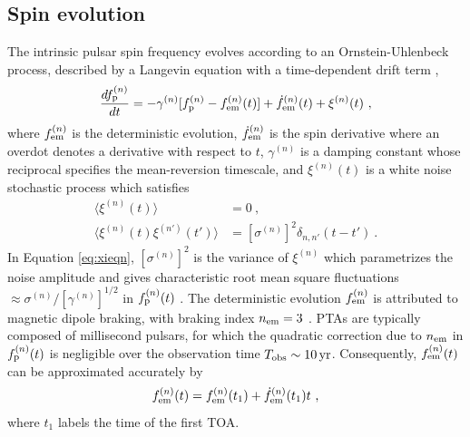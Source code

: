 \documentclass[fleqn,usenatbib,useAMS]{mnras}
\begin{document}
\subsection{Spin evolution} \label{sec:psr_frequency}
The intrinsic pulsar spin frequency evolves according to an Ornstein-Uhlenbeck process, described by a Langevin equation with a time-dependent drift term \citep{Vargas},
\begin{equation}
	\frac{df_{\rm p}^{(n)}}{dt} = -\gamma^{(n)}	 [f_{\rm p}^{(n)} - f_{\rm em}^{(n)} (t)] + \dot{f}_{\rm em}^{(n)}(t) +\xi^{(n)}(t) \ , 
	\label{eq:frequency_evolution}
\end{equation}
where $f_{\rm em}^{(n)}$ is the deterministic evolution, $\dot{f}_{\rm em}^{(n)}$ is the spin derivative where an overdot denotes a derivative with respect to $t$, $\gamma^{(n)}$ is a damping constant whose reciprocal specifies the mean-reversion timescale, and $\xi^{(n)}(t)$ is a white noise stochastic process which satisfies
\begin{align}
	\langle \xi^{(n)}(t) \rangle &= 0 \ , \\
	\langle \xi^{(n)}(t) \xi^{(n')}(t') \rangle &= [\sigma^{(n)}]^2 \delta_{n,n'}(t - t') \ .	\label{eq:xieqn}
\end{align}
In Equation \eqref{eq:xieqn}, $[\sigma^{(n)}]^2$ is the variance of $\xi^{(n)}$ which parametrizes the noise amplitude and gives characteristic root mean square fluctuations $\approx \sigma^{(n)} / [\gamma^{(n)}]^{1/2}$ in $f_{\rm p}^{(n)}(t)$ \citep{gardiner2009stochastic}. The deterministic evolution $f_{\rm em}^{(n)}$ is attributed to magnetic dipole braking, with braking index $n_{\rm em}=3$ \citep{1969ApJ...157..869G}. PTAs are typically composed of millisecond pulsars, for which the quadratic correction due to $n_{\rm em}$ in $f_{\rm p}^{(n)}(t)$ is negligible over the observation time $T_{\rm obs} \sim 10 \, {\rm yr}$. Consequently, 	$f_{\rm em}^{(n)}(t)$ can be approximated accurately by 
\begin{equation}
	f_{\rm em}^{(n)}(t) = f_{\rm em}^{(n)}(t_1) + \dot{f}_{\rm em}^{(n)}(t_1)t \ , \label{eq:spinevol}
\end{equation} 
where $t_1$ labels the time of the first TOA. \newline 
\end{document}
